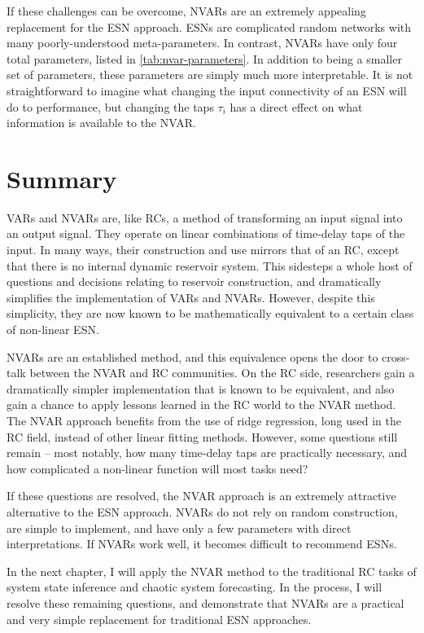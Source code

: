 If these challenges can be overcome, NVARs are an extremely appealing
replacement for the ESN approach. ESNs are complicated random networks
with many poorly-understood meta-parameters. In contrast, NVARs have
only four total parameters, listed in \cref{tab:nvar-parameters}.  In
addition to being a smaller set of parameters, these parameters are
simply much more interpretable. It is not straightforward to imagine
what changing the input connectivity of an ESN will do to performance,
but changing the taps $\tau_i$ has a direct effect on what information
is available to the NVAR.

\section{Summary}

VARs and NVARs are, like RCs, a method of transforming an input signal
into an output signal. They operate on linear combinations of
time-delay taps of the input. In many ways, their construction and use
mirrors that of an RC, except that there is no internal dynamic
reservoir system. This sidesteps a whole host of questions and
decisions relating to reservoir construction, and dramatically
simplifies the implementation of VARs and NVARs. However, despite this
simplicity, they are now known to be mathematically equivalent to a
certain class of non-linear ESN.

NVARs are an established method, and this equivalence opens the door
to cross-talk between the NVAR and RC communities. On the RC side,
researchers gain a dramatically simpler implementation that is known
to be equivalent, and also gain a chance to apply lessons learned in
the RC world to the NVAR method. The NVAR approach benefits from the
use of ridge regression, long used in the RC field, instead of other
linear fitting methods. However, some questions still remain -- most
notably, how many time-delay taps are practically necessary, and how
complicated a non-linear function will most tasks need?

If these questions are resolved, the NVAR approach is an extremely
attractive alternative to the ESN approach. NVARs do not rely on
random construction, are simple to implement, and have only a few
parameters with direct interpretations. If NVARs work well, it becomes
difficult to recommend ESNs.

In the next chapter, I will apply the NVAR method to the traditional
RC tasks of system state inference and chaotic system forecasting. In
the process, I will resolve these remaining questions, and demonstrate
that NVARs are a practical and very simple replacement for traditional
ESN approaches.
